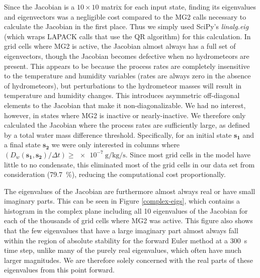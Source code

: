 \documentclass [11pt, proquest] {uwthesis}[2020/02/24]
\begin{document}
Since the Jacobian is a $\num{10} \times \num{10}$ matrix for each input state, finding its eigenvalues and eigenvectors was a negligible cost compared to the MG2 calls necessary to calculate the Jacobian in the first place. Thus we simply used SciPy's \emph{linalg.eig} (which wraps LAPACK calls that use the QR algorithm) for this calculation. In grid cells where MG2 is active, the Jacobian almost always has a full set of eigenvectors, though the Jacobian becomes defective when no hydrometeors are present. This appears to be because the process rates are completely insensitive to the temperature and humidity variables (rates are always zero in the absence of hydrometeors), but perturbations to the hydrometeor masses will result in temperature and humidity changes. This introduces asymmetric off-diagonal elements to the Jacobian that make it non-diagonalizable. We had no interest, however, in states where MG2 is inactive or nearly-inactive. We therefore only calculated the Jacobian where the process rates are sufficiently large, as defined by a total water mass difference threshold. Specifically, for an initial state $\mathbf{s_1}$ and a final state $\mathbf{s_2}$ we were only interested in columns where $(D_w(\mathbf{s_1}, \mathbf{s_2})/\Delta t) \ge \SI{e-7}{\gram\per\kilo\gram\per\second}$. Since most grid cells in the model have little to no condensate, this eliminated most of the grid cells in our data set from consideration (\SI{79.7}{\percent}), reducing the computational cost proportionally.

The eigenvalues of the Jacobian are furthermore almost always real or have small imaginary parts. This can be seen in Figure \ref{complex-eigs}, which contains a histogram in the complex plane including all \num{10} eigenvalues of the Jacobian for each of the thousands of grid cells where MG2 was active. This figure also shows that the few eigenvalues that have a large imaginary part almost always fall within the region of absolute stability for the forward Euler method at a \SI{300}{\second} time step, unlike many of the purely real eigenvalues, which often have much larger magnitudes. We are therefore solely concerned with the real parts of these eigenvalues from this point forward.
\end{document}
